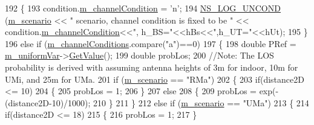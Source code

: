 \begin{DoxyCode}
192                 \{
193                         condition.\hyperlink{structchannelCondition_a1fbbec1a89c5da0961efaca304ade4d1}{m\_channelCondition} = \textcolor{charliteral}{'n'};
194                         \hyperlink{log-macros-disabled_8h_a0b36e5e182b37194f85ef1c5e979fb2e}{NS\_LOG\_UNCOND} (\hyperlink{classMmWave3gppPropagationLossModel_a3ba2b9e45f4d02e49620faf03f97e898}{m\_scenario} << \textcolor{stringliteral}{" scenario, channel condition
       is fixed to be "} << condition.\hyperlink{structchannelCondition_a1fbbec1a89c5da0961efaca304ade4d1}{m\_channelCondition}<<\textcolor{stringliteral}{", h\_BS="}<<hBs<<\textcolor{stringliteral}{",h\_UT="}<<hUt);
195                 \}
196                 \textcolor{keywordflow}{else} \textcolor{keywordflow}{if} (\hyperlink{classMmWave3gppPropagationLossModel_a416f5b42f67f2d950344b4746885230d}{m\_channelConditions}.compare(\textcolor{stringliteral}{"a"})==0)
197                 \{
198                         \textcolor{keywordtype}{double} PRef = \hyperlink{classMmWave3gppPropagationLossModel_a03532a0deaf28490552b0ba27bae9afa}{m\_uniformVar}->\hyperlink{classns3_1_1UniformRandomVariable_a03822d8c86ac51e9aa83bbc73041386b}{GetValue}();
199                         \textcolor{keywordtype}{double} probLos;
200                         \textcolor{comment}{//Note: The LOS probability is derived with assuming antenna heights of 3m for
       indoor, 10m for UMi, and 25m for UMa.}
201                         \textcolor{keywordflow}{if} (\hyperlink{classMmWave3gppPropagationLossModel_a3ba2b9e45f4d02e49620faf03f97e898}{m\_scenario} == \textcolor{stringliteral}{"RMa"})
202                         \{
203                                 \textcolor{keywordflow}{if}(distance2D <= 10)
204                                 \{
205                                         probLos = 1;
206                                 \}
207                                 \textcolor{keywordflow}{else}
208                                 \{
209                                         probLos = exp(-(distance2D-10)/1000);
210                                 \}
211                         \}
212                         \textcolor{keywordflow}{else} \textcolor{keywordflow}{if} (\hyperlink{classMmWave3gppPropagationLossModel_a3ba2b9e45f4d02e49620faf03f97e898}{m\_scenario} == \textcolor{stringliteral}{"UMa"})
213                         \{
214                                 \textcolor{keywordflow}{if}(distance2D <= 18)
215                                 \{
216                                         probLos = 1;
217                                 \}

\end{DoxyCode}
